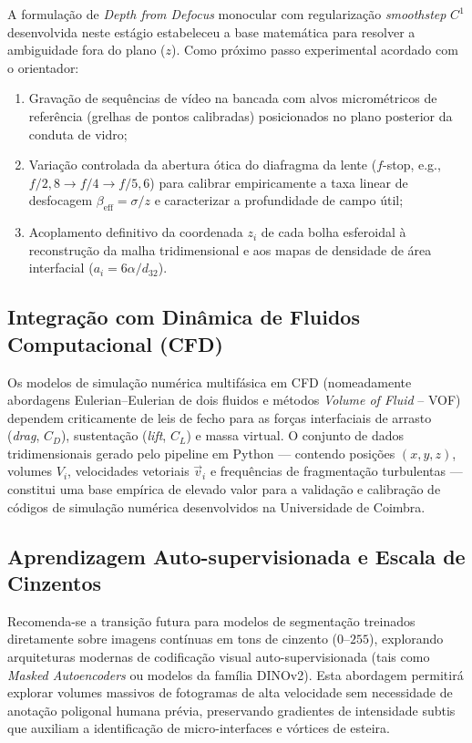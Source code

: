 A formulação de \emph{Depth from Defocus} monocular com regularização \emph{smoothstep} $C^1$ desenvolvida neste estágio estabeleceu a base matemática para resolver a ambiguidade fora do plano ($z$). Como próximo passo experimental acordado com o orientador:
\begin{enumerate}
    \item Gravação de sequências de vídeo na bancada com alvos micrométricos de referência (grelhas de pontos calibradas) posicionados no plano posterior da conduta de vidro;
    \item Variação controlada da abertura ótica do diafragma da lente ($f$-stop, e.g., $f/2{,}8 \to f/4 \to f/5{,}6$) para calibrar empiricamente a taxa linear de desfocagem $\beta_{\text{eff}} = \sigma / z$ e caracterizar a profundidade de campo útil;
    \item Acoplamento definitivo da coordenada $z_i$ de cada bolha esferoidal à reconstrução da malha tridimensional e aos mapas de densidade de área interfacial ($a_i = 6\alpha / d_{32}$).
\end{enumerate}

\subsection{Integração com Dinâmica de Fluidos Computacional (CFD)}
\label{subsec:integracao_cfd}

Os modelos de simulação numérica multifásica em CFD (nomeadamente abordagens Eulerian--Eulerian de dois fluidos e métodos \emph{Volume of Fluid} -- VOF) dependem criticamente de leis de fecho para as forças interfaciais de arrasto (\emph{drag}, $C_D$), sustentação (\emph{lift}, $C_L$) e massa virtual. O conjunto de dados tridimensionais gerado pelo pipeline em Python --- contendo posições $(x, y, z)$, volumes $V_i$, velocidades vetoriais $\vec{v}_i$ e frequências de fragmentação turbulentas --- constitui uma base empírica de elevado valor para a validação e calibração de códigos de simulação numérica desenvolvidos na Universidade de Coimbra.

\subsection{Aprendizagem Auto-supervisionada e Escala de Cinzentos}
\label{subsec:aprendizagem_auto}

Recomenda-se a transição futura para modelos de segmentação treinados diretamente sobre imagens contínuas em tons de cinzento ($0\text{--}255$), explorando arquiteturas modernas de codificação visual auto-supervisionada (tais como \emph{Masked Autoencoders} ou modelos da família DINOv2). Esta abordagem permitirá explorar volumes massivos de fotogramas de alta velocidade sem necessidade de anotação poligonal humana prévia, preservando gradientes de intensidade subtis que auxiliam a identificação de micro-interfaces e vórtices de esteira.

